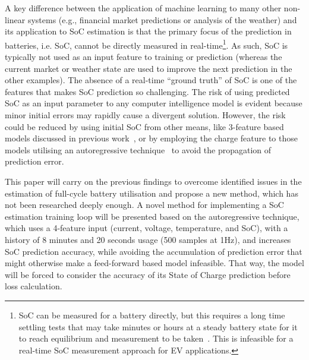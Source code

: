 %
%
A key difference between the application of machine learning to many other non-linear systems (e.g., financial market predictions or analysis of the weather) and its application to SoC estimation is that the primary focus of the prediction in batteries, i.e. SoC, cannot be directly measured in real-time\footnote{SoC can be measured for a battery directly, but this requires a long time settling tests that may take minutes or hours at a steady battery state for it to reach equilibrium and measurement to be taken~\cite{ali_towards_2019}. This is infeasible for a real-time SoC measurement approach for EV applications.}.
As such, SoC is typically not used as an input feature to training or prediction (whereas the current market or weather state are used to improve the next prediction in the other examples).
The absence of a real-time “ground truth” of SoC is one of the features that makes SoC prediction so challenging.
The risk of using predicted SoC as an input parameter to any computer intelligence model is evident because minor initial errors may rapidly cause a divergent solution.
However, the risk could be reduced by using initial SoC from other means, like 3-feature based models discussed in previous work~\cite{sadykov_practical_2022}, or by employing the charge feature to those models utilising an autoregressive technique~\cite{time_2020} to avoid the propagation of prediction error.

%
%
This paper will carry on the previous findings to overcome identified issues in the estimation of full-cycle battery utilisation and propose a new method, which has not been researched deeply enough.
A novel method for implementing a SoC estimation training loop will be presented based on the autoregressive technique, which uses a 4-feature input (current, voltage, temperature, and SoC), with a history of 8 minutes and 20 seconds usage (500 samples at 1Hz), and increases SoC prediction accuracy, while avoiding the accumulation of prediction error that might otherwise make a feed-forward based model infeasible.
That way, the model will be forced to consider the accuracy of its State of Charge prediction before loss calculation.

